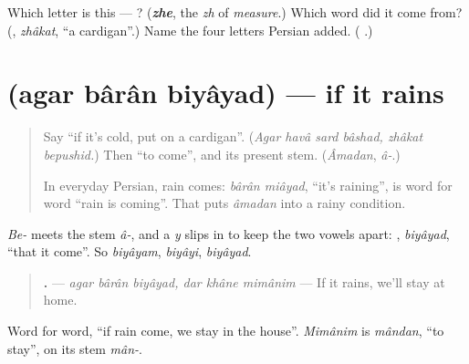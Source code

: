 \begin{tcolorbox}[breakable,colback=teal!4,colframe=teal!35!black,title={Before you move on}]
Which letter is this — ? (\emph{\textbf{zhe}}, the \emph{zh} of \emph{measure}.) Which word did it come from? (\textbf{}, \emph{zhâkat}, \textquotedblleft{}a cardigan\textquotedblright{}.) Name the four letters Persian added. (\textbf{   }.)
\end{tcolorbox}
\section[\texorpdfstring{\fa{اگر} \fa{باران} \fa{بیاید} (agar bârân biyâyad)}{اگر باران بیاید (agar bârân biyâyad)}]{   (agar bârân biyâyad) — if it rains}

\label{lesson:FA-C298-agar-baran-biyayad}



\begin{quote}
Say \textquotedblleft{}if it's cold, put on a cardigan\textquotedblright{}. (\emph{Agar havâ sard bâshad, zhâkat bepushid.}) Then \textquotedblleft{}to come\textquotedblright{}, and its present stem. (\emph{Âmadan}, \emph{â-}.)

In everyday Persian, rain comes: \emph{bârân miâyad}, \textquotedblleft{}it's raining\textquotedblright{}, is word for word \textquotedblleft{}rain is coming\textquotedblright{}. That puts \emph{âmadan} into a rainy condition.
\end{quote}

\begin{grammarlens}[title={Grammar Lens: biyâyad, the subjunctive of âmadan}]
\emph{Be-} meets the stem \emph{â-}, and a \emph{y} slips in to keep the two vowels apart: \textbf{}, \emph{biyâyad}, \textquotedblleft{}that it come\textquotedblright{}. So \emph{biyâyam}, \emph{biyâyi}, \emph{biyâyad}.

\begin{quote}
\textbf{     .} — \emph{agar bârân biyâyad, dar khâne mimânim} — If it rains, we'll stay at home.
\end{quote}

Word for word, \textquotedblleft{}if rain come, we stay in the house\textquotedblright{}. \emph{Mimânim} is \emph{mândan}, \textquotedblleft{}to stay\textquotedblright{}, on its stem \emph{mân-}.
\end{grammarlens}

